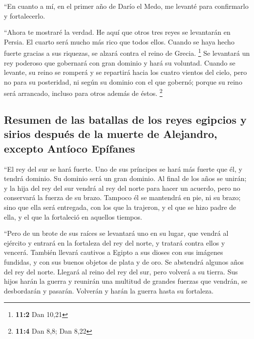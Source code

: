 \begin{paracol}{2}
 ``En cuanto a mí, en el primer año de Darío el Medo, me
levanté para confirmarlo y fortalecerlo.

 ``Ahora te mostraré la verdad. He aquí que otros tres
reyes se levantarán en Persia. El cuarto será mucho más rico que todos
ellos. Cuando se haya hecho fuerte gracias a sus riquezas, se alzará
contra el reino de Grecia. \footnote{\textbf{11:2} Dan 10,21}
 Se levantará un rey poderoso que gobernará con gran
dominio y hará su voluntad.  Cuando se levante, su reino
se romperá y se repartirá hacia los cuatro vientos del cielo, pero no
para su posteridad, ni según su dominio con el que gobernó; porque su
reino será arrancado, incluso para otros además de éstos. \footnote{\textbf{11:4}
  Dan 8,8; Dan 8,22}

\hypertarget{resumen-de-las-batallas-de-los-reyes-egipcios-y-sirios-despuuxe9s-de-la-muerte-de-alejandro-excepto-antuxedoco-epuxedfanes}{%
\subsection{Resumen de las batallas de los reyes egipcios y sirios
después de la muerte de Alejandro, excepto Antíoco
Epífanes}\label{resumen-de-las-batallas-de-los-reyes-egipcios-y-sirios-despuuxe9s-de-la-muerte-de-alejandro-excepto-antuxedoco-epuxedfanes}}

 ``El rey del sur se hará fuerte. Uno de sus príncipes se
hará más fuerte que él, y tendrá dominio. Su dominio será un gran
dominio.  Al final de los años se unirán; y la hija del
rey del sur vendrá al rey del norte para hacer un acuerdo, pero no
conservará la fuerza de su brazo. Tampoco él se mantendrá en pie, ni su
brazo; sino que ella será entregada, con los que la trajeron, y el que
se hizo padre de ella, y el que la fortaleció en aquellos tiempos.

 ``Pero de un brote de sus raíces se levantará uno en su
lugar, que vendrá al ejército y entrará en la fortaleza del rey del
norte, y tratará contra ellos y vencerá.  También llevará
cautivos a Egipto a sus dioses con sus imágenes fundidas, y con sus
buenos objetos de plata y de oro. Se abstendrá algunos años del rey del
norte.  Llegará al reino del rey del sur, pero volverá a
su tierra.  Sus hijos harán la guerra y reunirán una
multitud de grandes fuerzas que vendrán, se desbordarán y pasarán.
Volverán y harán la guerra hasta su fortaleza.


\end{paracol}
